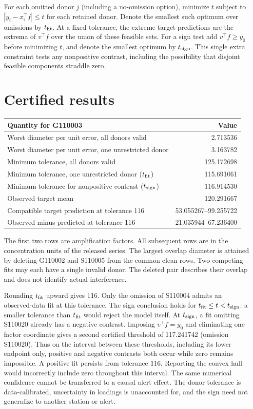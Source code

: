 \documentclass[11pt]{article}
\begin{document}
For each omitted donor $j$ (including a no-omission option), minimize $t$ subject to $|y_i-x_i^\top f|\le t$ for each retained donor. Denote the smallest such optimum over omissions by $t_{\rm fit}$. At a fixed tolerance, the extreme target predictions are the extrema of $v^\top f$ over the union of these feasible sets. For a sign test add $v^\top f\ge y_0$ before minimizing $t$, and denote the smallest optimum by $t_{\rm sign}$. This single extra constraint tests any nonpositive contrast, including the possibility that disjoint feasible components straddle zero.

\section{Certified results}
\begin{center}
\begin{tabular}{lr}
\toprule
Quantity for G110003 & Value\\\midrule
Worst diameter per unit error, all donors valid & 2.713536\\
Worst diameter per unit error, one unrestricted donor & 3.163782\\
Minimum tolerance, all donors valid & 125.172698\\
Minimum tolerance, one unrestricted donor ($t_{\rm fit}$) & 115.691061\\
Minimum tolerance for nonpositive contrast ($t_{\rm sign}$) & 116.914530\\
Observed target mean & 120.291667\\
Compatible target prediction at tolerance 116 & 53.055267--99.255722\\
Observed minus predicted at tolerance 116 & 21.035944--67.236400\\
\bottomrule
\end{tabular}
\end{center}
The first two rows are amplification factors. All subsequent rows are in the concentration units of the released series. The largest overlap diameter is attained by deleting G110002 and S110005 from the common clean rows. Two competing fits may each have a single invalid donor. The deleted pair describes their overlap and does not identify actual interference.

Rounding $t_{\rm fit}$ upward gives 116. Only the omission of S110004 admits an observed-data fit at this tolerance. The sign conclusion holds for $t_{\rm fit}\le t<t_{\rm sign}$: a smaller tolerance than $t_{\rm fit}$ would reject the model itself. At $t_{\rm sign}$, a fit omitting S110020 already has a negative contrast. Imposing $v^\top f=y_0$ and eliminating one factor coordinate gives a second certified threshold of 117.241742 (omission S110020). Thus on the interval between these thresholds, including its lower endpoint only, positive and negative contrasts both occur while zero remains impossible. A positive fit persists from tolerance 116. Reporting the convex hull would incorrectly include zero throughout this interval. The same numerical confidence cannot be transferred to a causal alert effect. The donor tolerance is data-calibrated, uncertainty in loadings is unaccounted for, and the sign need not generalize to another station or alert.
\end{document}
